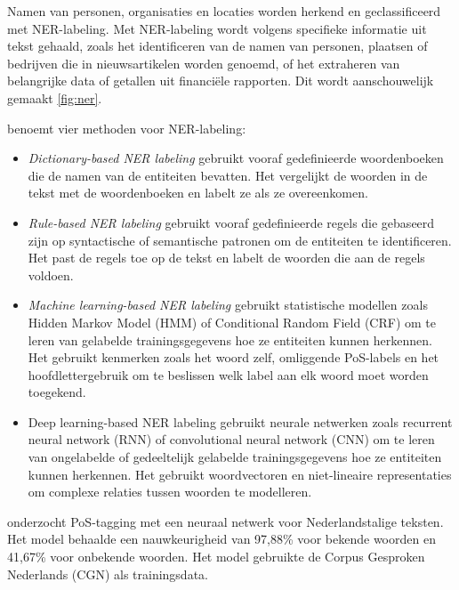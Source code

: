 Namen van personen, organisaties en locaties worden herkend en geclassificeerd met NER-labeling. Met NER-labeling wordt volgens \textcite{Jurafsky2014} specifieke informatie uit tekst gehaald, zoals het identificeren van de namen van personen, plaatsen of bedrijven die in nieuwsartikelen worden genoemd, of het extraheren van belangrijke data of getallen uit financiële rapporten. Dit wordt aanschouwelijk gemaakt \ref{fig:ner}. 


\textcite{Li2018} benoemt vier methoden voor NER-labeling:
\begin{itemize}
		\item \textit{Dictionary-based NER labeling} gebruikt vooraf gedefinieerde woordenboeken die de namen van de entiteiten bevatten. Het vergelijkt de woorden in de tekst met de woordenboeken en labelt ze als ze overeenkomen.
		\item \textit{Rule-based NER labeling} gebruikt vooraf gedefinieerde regels die gebaseerd zijn op syntactische of semantische patronen om de entiteiten te identificeren. Het past de regels toe op de tekst en labelt de woorden die aan de regels voldoen.
		\item \textit{Machine learning-based NER labeling} gebruikt statistische modellen zoals Hidden Markov Model (HMM) of Conditional Random Field (CRF) om te leren van gelabelde trainingsgegevens hoe ze entiteiten kunnen herkennen. Het gebruikt kenmerken zoals het woord zelf, omliggende PoS-labels en het hoofdlettergebruik om te beslissen welk label aan elk woord moet worden toegekend.
		\item Deep learning-based NER labeling gebruikt neurale netwerken zoals recurrent neural network (RNN) of convolutional neural network (CNN) om te leren van ongelabelde of gedeeltelijk gelabelde trainingsgegevens hoe ze entiteiten kunnen herkennen. Het gebruikt woordvectoren en niet-lineaire representaties om complexe relaties tussen woorden te modelleren.
\end{itemize}


\textcite{Poel2008} onderzocht PoS-tagging met een neuraal netwerk voor Nederlandstalige teksten. Het model behaalde een nauwkeurigheid van 97,88\% voor bekende woorden en 41,67\% voor onbekende woorden. Het model gebruikte de Corpus Gesproken Nederlands (CGN) als trainingsdata.

